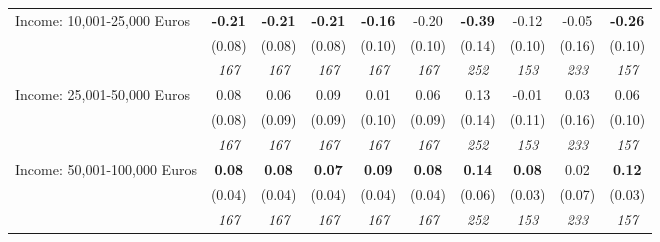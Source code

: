 \begin{tabular}{l c c c c c c c c c}
Income: 10,001-25,000 Euros & \textbf{ -0.21 } & \textbf{ -0.21 } & \textbf{ -0.21 } & \textbf{-0.16} & -0.20 & \textbf{ -0.39 } & -0.12 & -0.05 & \textbf{-0.26} \\
& (0.08) & (0.08) & (0.08) & (0.10) & (0.10) & (0.14) & (0.10) & (0.16) & (0.10) \\
& \textit{ 167 } & \textit{ 167 } & \textit{ 167 } & \textit{ 167 } & \textit{ 167 } & \textit{ 252 } & \textit{ 153 } & \textit{ 233 } & \textit{ 157 } \\
Income: 25,001-50,000 Euros & 0.08 & 0.06 & 0.09 & 0.01 & 0.06 & 0.13 & -0.01 & 0.03 & 0.06 \\
& (0.08) & (0.09) & (0.09) & (0.10) & (0.09) & (0.14) & (0.11) & (0.16) & (0.10) \\
& \textit{ 167 } & \textit{ 167 } & \textit{ 167 } & \textit{ 167 } & \textit{ 167 } & \textit{ 252 } & \textit{ 153 } & \textit{ 233 } & \textit{ 157 } \\
Income: 50,001-100,000 Euros & \textbf{ 0.08 } & \textbf{ 0.08 } & \textbf{ 0.07 } & \textbf{0.09} & \textbf{0.08} & \textbf{ 0.14 } & \textbf{0.08} & 0.02 & \textbf{0.12} \\
& (0.04) & (0.04) & (0.04) & (0.04) & (0.04) & (0.06) & (0.03) & (0.07) & (0.03) \\
& \textit{ 167 } & \textit{ 167 } & \textit{ 167 } & \textit{ 167 } & \textit{ 167 } & \textit{ 252 } & \textit{ 153 } & \textit{ 233 } & \textit{ 157 } \\
\bottomrule
\end{tabular}
